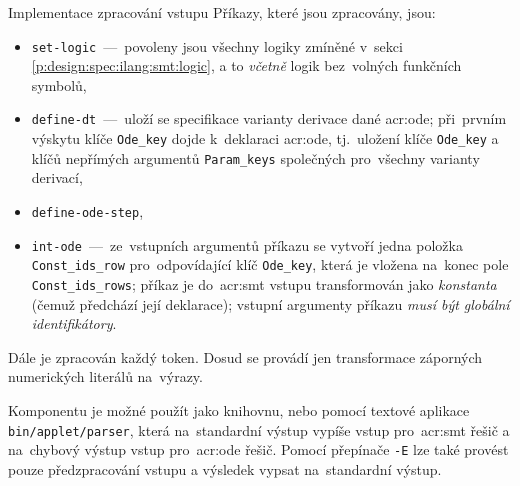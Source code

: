 \documentclass[thesis=M,czech]{FITthesis}[2012/06/26]
\newcommand{\acrlabel}[1]{acr:#1}
\newcommand{\acr}[1]{\acrshort{\acrlabel{#1}}}
\newcommand{\id}[1]{\texttt{#1}}
\newcommand{\hl}[1]{\textit{#1}}
\newcommand{\rf}[1]{\ref{#1}}
\newcommand{\binDir}{\id{bin}}
\newcommand{\appletDir}{\id{\binDir{}/\-applet}}
\newcommand{\appletFn}[1]{\id{\appletDir{}/\-#1}}
\begin{document}
\begin{section}{Implementace zpracování vstupu}
Příkazy, které jsou zpracovány, jsou:
\begin{itemize}
\item \id{set\--logic}~---~povoleny jsou všechny logiky
   zmíněné v~sekci \rf{p:design:spec:ilang:smt:logic},
   a to \hl{včetně} logik bez~volných funkčních symbolů,
\item \id{define\--dt}~---~uloží se specifikace varianty
   derivace dané \acr{ode}; při~prvním výskytu
   klíče \id{Ode\_\-key} dojde k~deklaraci \acr{ode},
   tj.~uložení klíče \id{Ode\_\-key}
   a klíčů nepřímých argumentů \id{Param\_\-keys}
   společných pro~všechny varianty derivací,
\item \id{define\--ode\--step},
\item \id{int\--ode}~---~ze~vstupních argumentů příkazu
   se vytvoří jedna položka \id{Const\_\-ids\_\-row}
   pro~odpovídající klíč \id{Ode\_\-key},
   která je vložena na~konec pole \id{Const\_\-ids\_\-rows};
   příkaz je do~\acr{smt} vstupu transformován jako \hl{konstanta}
   (čemuž předchází její deklarace);
   vstupní argumenty příkazu \hl{musí být globální identifikátory}.
\end{itemize}

Dále je zpracován každý token.
Dosud se provádí jen transformace
záporných numerických literálů na~výrazy.

Komponentu je možné použít jako knihovnu,
nebo pomocí textové aplikace \appletFn{parser},
která na~standardní výstup vypíše
vstup pro~\acr{smt} řešič
a na~chybový výstup
vstup pro~\acr{ode} řešič.
Pomocí přepínače \id{-E}
lze také provést pouze předzpracování vstupu
a výsledek vypsat na~standardní výstup.
\end{section} %

\end{document}
